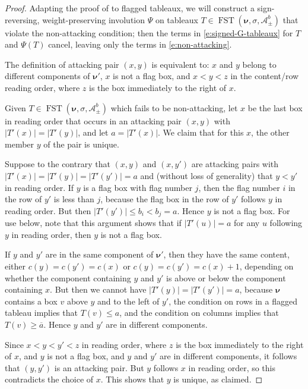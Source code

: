 \documentclass[12pt]{amsart}
\theoremstyle{definition}
\theoremstyle{remark}
\newcommand{\nubold}{{\boldsymbol \nu }}
\newcommand{\Acal}{{\mathcal A}}
\DeclareMathOperator{\FSST}{FST}
\begin{document}
\begin{proof}
Adapting the proof of \cite[Lemma~5.1]{HagHaiLo05} to flagged
tableaux, we will construct a sign-reversing, weight-preserving
involution $\Psi $ on tableaux $T\in \FSST (\nubold ,\sigma ,\Acal
^{b}_{\pm })$ that violate the non-attacking condition; then the terms
in \eqref{e:signed-G-tableaux} for $T$ and $\Psi (T)$ cancel, leaving
only the terms in \eqref{e:non-attacking}.

The definition of attacking pair $(x,y)$ is equivalent to: $x$ and $y$
belong to different components of $\nubold '$, $x$ is not a flag box,
and $x<y<z$ in the content/row reading order, where $z$ is the box
immediately to the right of $x$.

Given $T\in \FSST (\nubold ,\sigma ,\Acal ^{b}_{\pm })$ which fails to
be non-attacking, let $x$ be the last box in reading order that occurs
in an attacking pair $(x,y)$ with $|T'(x)| = |T'(y)|$, and let $a =
|T'(x)|$.  We claim that for this $x$, the other member $y$ of the
pair is unique.

Suppose to the contrary that $(x,y)$ and $(x,y')$ are attacking pairs
with $|T'(x)| = |T'(y)| = |T'(y')| = a$ and (without loss of
generality) that $y<y'$ in reading order.  If $y$ is a flag box with
flag number $j$, then the flag number $i$ in the row of $y'$ is less
than $j$, because the flag box in the row of $y'$ follows $y$ in
reading order.  But then $|T'(y')|\leq b_{i}<b_{j}= a$.  Hence $y$ is
not a flag box.  For use below, note that this argument shows that if
$|T'(u)| = a$ for any $u$ following $y$ in reading order, then $y$ is
not a flag box.

If $y$ and $y'$ are in the same component of $\nubold '$, then they
have the same content, either $c(y) = c(y') = c(x)$ or $c(y) = c(y') =
c(x)+1$, depending on whether the component containing $y$ and $y'$ is
above or below the component containing $x$.  But then we cannot have
$|T'(y)| = |T'(y')| = a$, because $\nubold $ contains a box $v$ above
$y$ and to the left of $y'$, the condition on rows in a flagged
tableau implies that $T(v)\leq a$, and the condition on columns
implies that $T(v)\geq \overline{a}$.  Hence $y$ and $y'$ are in
different components.

Since $x<y<y'<z$ in reading order, where $z$ is the box
immediately to the right of $x$, and $y$ is not a flag box, and $y$
and $y'$ are in different components, it follows that $(y,y')$ is an
attacking pair.  But $y$ follows $x$ in reading order, so this
contradicts the choice of $x$.  This shows that $y$ is unique, as
claimed.


\end{proof}
\end{document}

